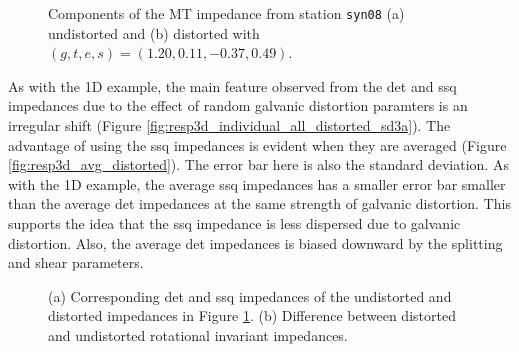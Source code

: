\begin{figure}[t]
	\centering
	\caption[Examples of undistorted and distorted 3D MT data]{Components of the MT impedance from station \texttt{syn08} (a) undistorted and (b) distorted with $(g,t,e,s) = (1.20,0.11,-0.37,0.49)$.}
	\label{fig:resp3d_example_zij}
\end{figure}


As with the 1D example, the main feature observed from the det and ssq impedances due to the effect of random galvanic distortion paramters is an irregular shift (Figure \ref{fig:resp3d_individual_all_distorted_sd3a}). 
The advantage of using the ssq impedances is evident when they are averaged (Figure \ref{fig:resp3d_avg_distorted}). 
The error bar here is also the standard deviation.
As with the 1D example, the average ssq impedances has a smaller error bar smaller than the average det impedances at the same strength of galvanic distortion. 
This supports the idea that the ssq impedance is less dispersed due to galvanic distortion. 
Also, the average det impedances is biased downward by the splitting and shear parameters.

\begin{figure}[t]
	\centering
	\caption[Det and ssq impedances derived from the undistorted and distored MT impedance]{(a) Corresponding det and ssq impedances of the undistorted and distorted impedances in Figure \ref{fig:resp3d_example_zij}. (b) Difference between distorted and undistorted rotational invariant impedances.}
	\label{fig:resp3d_example_distorted}
\end{figure}

